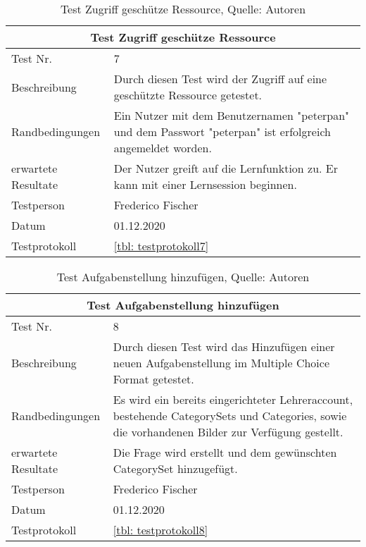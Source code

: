 \begin{table}[H]
\begin{tabularx}{\textwidth}{lX}
  \hline
  \multicolumn{2}{|c|}{Test Zugriff geschütze Ressource} \\
  \hline
  Test Nr. & 7\\
  Beschreibung & Durch diesen Test wird der  Zugriff auf eine geschützte Ressource getestet.  \\
  Randbedingungen & Ein Nutzer mit dem Benutzernamen "peterpan" und dem Passwort "peterpan" ist erfolgreich angemeldet worden. \\
  erwartete Resultate & Der Nutzer greift auf die Lernfunktion zu. Er kann mit einer Lernsession beginnen.   \\
  Testperson & Frederico Fischer \\
  Datum & 01.12.2020 \\
  Testprotokoll & \ref{tbl: testprotokoll7}\\
   \hline
\end{tabularx}
\caption{ \label{tbl: Test Login}Test Zugriff geschütze Ressource, Quelle: Autoren}
\end{table}

\begin{table}[H]
\begin{tabularx}{\textwidth}{lX}
  \hline
  \multicolumn{2}{|c|}{Test Aufgabenstellung hinzufügen} \\
  \hline
  Test Nr. & 8\\
  Beschreibung & Durch diesen Test wird das Hinzufügen einer neuen Aufgabenstellung im Multiple Choice Format getestet. \\
  Randbedingungen & Es wird ein bereits eingerichteter Lehreraccount,  bestehende CategorySets und Categories, sowie die vorhandenen Bilder zur Verfügung gestellt. \\
  erwartete Resultate &  Die Frage wird erstellt und dem gewünschten CategorySet hinzugefügt. \\
  Testperson & Frederico Fischer \\
  Datum & 01.12.2020 \\
  Testprotokoll & \ref{tbl: testprotokoll8}\\
   \hline
\end{tabularx}
\caption{ \label{tbl: Test Aufgabenstellung hinzufuegen}Test Aufgabenstellung hinzufügen,  Quelle: Autoren}
\end{table}

